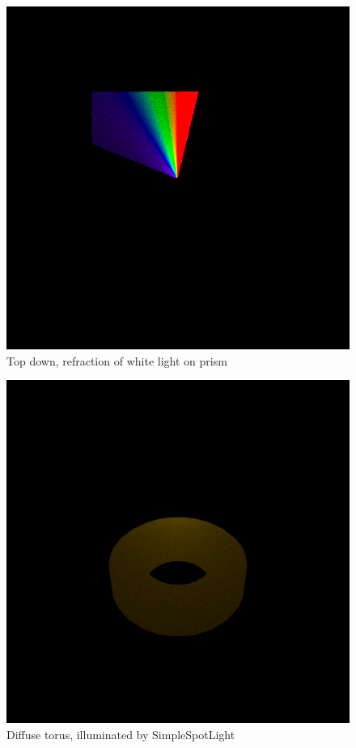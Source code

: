\documentclass[12pt, letterpaper]{article}
\begin{document}
\begin{figure}[H]
\centering 
\includegraphics[scale=0.4]{Refraction117.png}
\caption{Top down, refraction of white light on prism}
\end{figure}
\begin{figure}[H]
\centering 
\includegraphics[scale=0.4]{Torus.png}
\caption{Diffuse torus, illuminated by SimpleSpotLight}
\end{figure}
\end{document}
